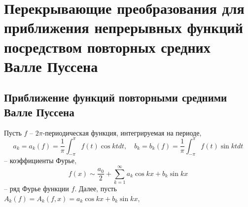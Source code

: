 \chapter{Перекрывающие преобразования для приближения непрерывных функций посредством повторных средних Валле Пуссена}











\section{ Приближение функций повторными средними Валле Пуссена}\label{s1}

Пусть $f$ -- $2\pi$-периодическая функция, интегрируемая на периоде,
\begin{equation*}
    a_k=a_k(f)=\frac1\pi\int_{-\pi}^\pi f(t)\cos ktdt,\quad b_k=b_k(f)=\frac1\pi\int_{-\pi}^\pi f(t)\sin ktdt
\end{equation*}
-- коэффициенты Фурье,
\begin{equation}\label{1.3}
    f(x) \sim \frac{a_0}{2}+ \sum_{k=1}^\infty a_k\cos kx+b_k\sin kx
\end{equation}
-- ряд Фурье функции $f$. Далее, пусть $A_k(f)=A_k(f,x)=a_k\cos kx+b_k\sin kx$,

